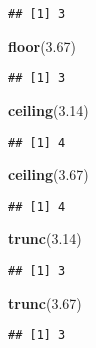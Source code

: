 \documentclass[]{book}
\newenvironment{Shaded}{\begin{snugshade}}{\end{snugshade}}
\newcommand{\KeywordTok}[1]{\textcolor[rgb]{0.13,0.29,0.53}{\textbf{{#1}}}}
\newcommand{\FloatTok}[1]{\textcolor[rgb]{0.00,0.00,0.81}{{#1}}}
\newcommand{\NormalTok}[1]{{#1}}
\begin{document}
\begin{verbatim}
## [1] 3
\end{verbatim}

\begin{Shaded}
\begin{Highlighting}[]
\KeywordTok{floor}\NormalTok{(}\FloatTok{3.67}\NormalTok{)}
\end{Highlighting}
\end{Shaded}

\begin{verbatim}
## [1] 3
\end{verbatim}

\begin{Shaded}
\begin{Highlighting}[]
\KeywordTok{ceiling}\NormalTok{(}\FloatTok{3.14}\NormalTok{)}
\end{Highlighting}
\end{Shaded}

\begin{verbatim}
## [1] 4
\end{verbatim}

\begin{Shaded}
\begin{Highlighting}[]
\KeywordTok{ceiling}\NormalTok{(}\FloatTok{3.67}\NormalTok{)}
\end{Highlighting}
\end{Shaded}

\begin{verbatim}
## [1] 4
\end{verbatim}

\begin{Shaded}
\begin{Highlighting}[]
\KeywordTok{trunc}\NormalTok{(}\FloatTok{3.14}\NormalTok{)}
\end{Highlighting}
\end{Shaded}

\begin{verbatim}
## [1] 3
\end{verbatim}

\begin{Shaded}
\begin{Highlighting}[]
\KeywordTok{trunc}\NormalTok{(}\FloatTok{3.67}\NormalTok{)}
\end{Highlighting}
\end{Shaded}

\begin{verbatim}
## [1] 3
\end{verbatim}
\end{document}
